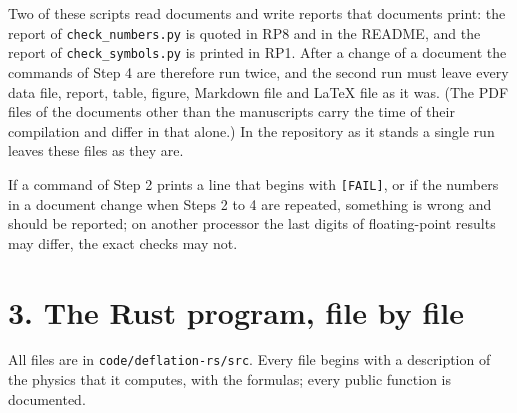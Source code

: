 \documentclass[
  10pt,
]{article}
\begin{document}
Two of these scripts read documents and write reports that documents
print: the report of \texttt{check\_numbers.py} is quoted in RP8 and in
the README, and the report of \texttt{check\_symbols.py} is printed in
RP1. After a change of a document the commands of Step 4 are therefore
run twice, and the second run must leave every data file, report, table,
figure, Markdown file and LaTeX file as it was. (The PDF files of the
documents other than the manuscripts carry the time of their compilation
and differ in that alone.) In the repository as it stands a single run
leaves these files as they are.

If a command of Step 2 prints a line that begins with
\texttt{{[}FAIL{]}}, or if the numbers in a document change when Steps 2
to 4 are repeated, something is wrong and should be reported; on another
processor the last digits of floating-point results may differ, the
exact checks may not.

\hypertarget{the-rust-program-file-by-file}{%
\section{3. The Rust program, file by
file}\label{the-rust-program-file-by-file}}

All files are in \texttt{code/deflation-rs/src}. Every file begins with
a description of the physics that it computes, with the formulas; every
public function is documented.
\end{document}
